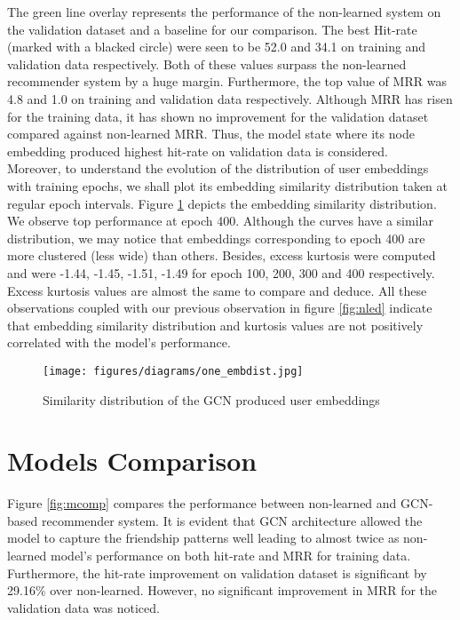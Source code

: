 \documentclass{kththesis}
\begin{document}
The green line overlay represents the performance of the non-learned system on the validation dataset and a baseline for our comparison. The best Hit-rate (marked with a blacked circle) were seen to be 52.0 and 34.1 on training and validation data respectively. Both of these values surpass the non-learned recommender system by a huge margin. Furthermore, the top value of MRR was 4.8 and 1.0 on training and validation data respectively. Although MRR has risen for the training data, it has shown no improvement for the validation dataset compared against non-learned MRR. Thus, the model state where its node embedding produced highest hit-rate on validation data is considered. \\

Moreover, to understand the evolution of the distribution of user embeddings with training epochs, we shall plot its embedding similarity distribution taken at regular epoch intervals. Figure \ref{fig:embdist} depicts the embedding similarity distribution. We observe top performance at epoch 400. Although the curves have a similar distribution, we may notice that embeddings corresponding to epoch 400 are more clustered (less wide) than others. Besides, excess kurtosis were computed and were -1.44, -1.45, -1.51, -1.49 for epoch 100, 200, 300 and 400 respectively. Excess kurtosis values are almost the same to compare and deduce. All these observations coupled with our previous observation in figure \ref{fig:nled} indicate that embedding similarity distribution and kurtosis values are not positively correlated with the model's performance. \\

\begin{figure}[h!]
\centering
\texttt{[image: figures/diagrams/one\_embdist.jpg]}
\caption{Similarity distribution of the GCN produced user embeddings}
\label{fig:embdist}
\end{figure}
\section{Models Comparison}
Figure \ref{fig:mcomp} compares the performance between non-learned and GCN-based recommender system. It is evident that GCN architecture allowed the model to capture the friendship patterns well leading to almost twice as non-learned model's performance on both hit-rate and MRR for training data. Furthermore, the hit-rate improvement on validation dataset is significant by 29.16\% over non-learned. However, no significant improvement in MRR for the validation data was noticed.
\end{document}

